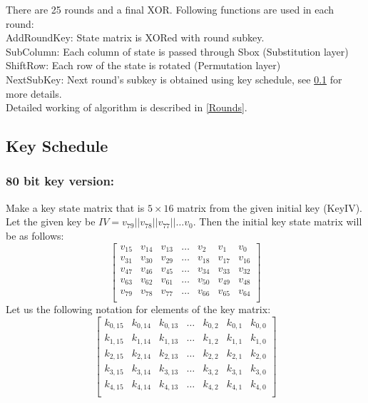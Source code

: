 \documentclass[final]{transcrypto}
\begin{document}
There are 25 rounds and a final XOR. Following functions are used in each round:\\
AddRoundKey: State matrix is XORed with round subkey.\\
SubColumn: Each column of state is passed through Sbox (Substitution layer)\\
ShiftRow: Each row of the state is rotated (Permutation layer)\\
NextSubKey: Next round's subkey is obtained using key schedule, see \ref{KeySchedule} for more details.\\
Detailed working of algorithm is described in \ref{Rounds}.
\subsection{Key Schedule}
\label{KeySchedule}
\subsubsection{80 bit key version:}
Make a key state matrix that is $5\times 16$ matrix from the given initial key (KeyIV).\\
Let the given key be $IV = v_{79}||v_{78}||v_{77}||\dots v_{0}$. Then the initial key state matrix will be as follows:
$$
\begin{bmatrix}
v_{15} & v_{14} & v_{13} & \dots & v_{2} & v_{1} & v_{0}\\
v_{31} & v_{30} & v_{29} & \dots & v_{18} & v_{17} & v_{16}\\
v_{47} & v_{46} & v_{45} & \dots & v_{34} & v_{33} & v_{32}\\
v_{63} & v_{62} & v_{61} & \dots & v_{50} & v_{49} & v_{48}\\
v_{79} & v_{78} & v_{77} & \dots & v_{66} & v_{65} & v_{64}\\
\end{bmatrix}
$$
Let us the following notation for elements of the key matrix:
$$
\begin{bmatrix}
k_{0,15} & k_{0,14} & k_{0,13} & \dots & k_{0,2} & k_{0,1} & k_{0,0}\\
k_{1,15} & k_{1,14} & k_{1,13} & \dots & k_{1,2} & k_{1,1} & k_{1,0}\\
k_{2,15} & k_{2,14} & k_{2,13} & \dots & k_{2,2} & k_{2,1} & k_{2,0}\\
k_{3,15} & k_{3,14} & k_{3,13} & \dots & k_{3,2} & k_{3,1} & k_{3,0}\\
k_{4,15} & k_{4,14} & k_{4,13} & \dots & k_{4,2} & k_{4,1} & k_{4,0}\\
\end{bmatrix}
$$
\end{document}
